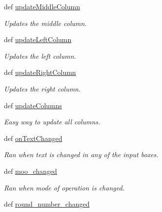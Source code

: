 \begin{DoxyCompactItemize}
def \hyperlink{classsimplegui_1_1_main_scene_a22c60c1b880ee015c51e35dce45a8267}{update\-Middle\-Column}
\begin{DoxyCompactList}\small\item\em Updates the middle column. \end{DoxyCompactList}\item 
def \hyperlink{classsimplegui_1_1_main_scene_af271c4ea829421b364c9ccce3ea6d88a}{update\-Left\-Column}
\begin{DoxyCompactList}\small\item\em Updates the left column. \end{DoxyCompactList}\item 
def \hyperlink{classsimplegui_1_1_main_scene_a9feca10a8fe6385d3515407200d70789}{update\-Right\-Column}
\begin{DoxyCompactList}\small\item\em Updates the right column. \end{DoxyCompactList}\item 
def \hyperlink{classsimplegui_1_1_main_scene_a3f57128f4c0a7608e2b6514915fdb821}{update\-Columns}
\begin{DoxyCompactList}\small\item\em Easy way to update all columns. \end{DoxyCompactList}\item 
def \hyperlink{classsimplegui_1_1_main_scene_af3b0457ad0c83dbe77810352fc765904}{on\-Text\-Changed}
\begin{DoxyCompactList}\small\item\em Ran when text is changed in any of the input boxes. \end{DoxyCompactList}\item 
def \hyperlink{classsimplegui_1_1_main_scene_acfb4597c5d0766c02a140455b80ec1f3}{moo\-\_\-changed}
\begin{DoxyCompactList}\small\item\em Ran when mode of operation is changed. \end{DoxyCompactList}\item 
\hypertarget{classsimplegui_1_1_main_scene_aecc02f06c9b870a63c17099f1c683b32}{def \hyperlink{classsimplegui_1_1_main_scene_aecc02f06c9b870a63c17099f1c683b32}{round\-\_\-number\-\_\-changed}}\label{classsimplegui_1_1_main_scene_aecc02f06c9b870a63c17099f1c683b32}


\end{DoxyCompactItemize}
